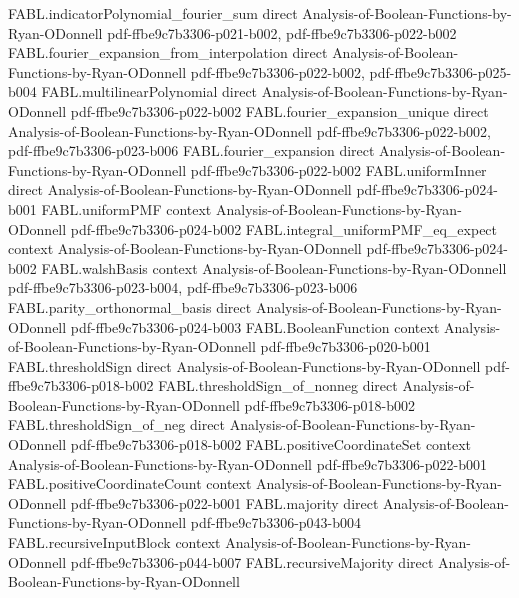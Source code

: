 \begin{theorem}
  {FABL.indicatorPolynomial_fourier_sum}
  {direct}
  {Analysis-of-Boolean-Functions-by-Ryan-ODonnell}
  {pdf-ffbe9c7b3306-p021-b002,
    pdf-ffbe9c7b3306-p022-b002}
\proofstep
  {FABL.fourier_expansion_from_interpolation}
  {direct}
  {Analysis-of-Boolean-Functions-by-Ryan-ODonnell}
  {pdf-ffbe9c7b3306-p022-b002,
    pdf-ffbe9c7b3306-p025-b004}
\proofstep
  {FABL.multilinearPolynomial}
  {direct}
  {Analysis-of-Boolean-Functions-by-Ryan-ODonnell}
  {pdf-ffbe9c7b3306-p022-b002}
\proofstep
  {FABL.fourier_expansion_unique}
  {direct}
  {Analysis-of-Boolean-Functions-by-Ryan-ODonnell}
  {pdf-ffbe9c7b3306-p022-b002,
    pdf-ffbe9c7b3306-p023-b006}
\proofstep
  {FABL.fourier_expansion}
  {direct}
  {Analysis-of-Boolean-Functions-by-Ryan-ODonnell}
  {pdf-ffbe9c7b3306-p022-b002}
\proofstep
  {FABL.uniformInner}
  {direct}
  {Analysis-of-Boolean-Functions-by-Ryan-ODonnell}
  {pdf-ffbe9c7b3306-p024-b001}
\proofstep
  {FABL.uniformPMF}
  {context}
  {Analysis-of-Boolean-Functions-by-Ryan-ODonnell}
  {pdf-ffbe9c7b3306-p024-b002}
\proofstep
  {FABL.integral_uniformPMF_eq_expect}
  {context}
  {Analysis-of-Boolean-Functions-by-Ryan-ODonnell}
  {pdf-ffbe9c7b3306-p024-b002}
\proofstep
  {FABL.walshBasis}
  {context}
  {Analysis-of-Boolean-Functions-by-Ryan-ODonnell}
  {pdf-ffbe9c7b3306-p023-b004,
    pdf-ffbe9c7b3306-p023-b006}
\proofstep
  {FABL.parity_orthonormal_basis}
  {direct}
  {Analysis-of-Boolean-Functions-by-Ryan-ODonnell}
  {pdf-ffbe9c7b3306-p024-b003}
\proofstep
  {FABL.BooleanFunction}
  {context}
  {Analysis-of-Boolean-Functions-by-Ryan-ODonnell}
  {pdf-ffbe9c7b3306-p020-b001}
\proofstep
  {FABL.thresholdSign}
  {direct}
  {Analysis-of-Boolean-Functions-by-Ryan-ODonnell}
  {pdf-ffbe9c7b3306-p018-b002}
\proofstep
  {FABL.thresholdSign_of_nonneg}
  {direct}
  {Analysis-of-Boolean-Functions-by-Ryan-ODonnell}
  {pdf-ffbe9c7b3306-p018-b002}
\proofstep
  {FABL.thresholdSign_of_neg}
  {direct}
  {Analysis-of-Boolean-Functions-by-Ryan-ODonnell}
  {pdf-ffbe9c7b3306-p018-b002}
\proofstep
  {FABL.positiveCoordinateSet}
  {context}
  {Analysis-of-Boolean-Functions-by-Ryan-ODonnell}
  {pdf-ffbe9c7b3306-p022-b001}
\proofstep
  {FABL.positiveCoordinateCount}
  {context}
  {Analysis-of-Boolean-Functions-by-Ryan-ODonnell}
  {pdf-ffbe9c7b3306-p022-b001}
\proofstep
  {FABL.majority}
  {direct}
  {Analysis-of-Boolean-Functions-by-Ryan-ODonnell}
  {pdf-ffbe9c7b3306-p043-b004}
\proofstep
  {FABL.recursiveInputBlock}
  {context}
  {Analysis-of-Boolean-Functions-by-Ryan-ODonnell}
  {pdf-ffbe9c7b3306-p044-b007}
\proofstep
  {FABL.recursiveMajority}
  {direct}
  {Analysis-of-Boolean-Functions-by-Ryan-ODonnell}

\end{theorem}
